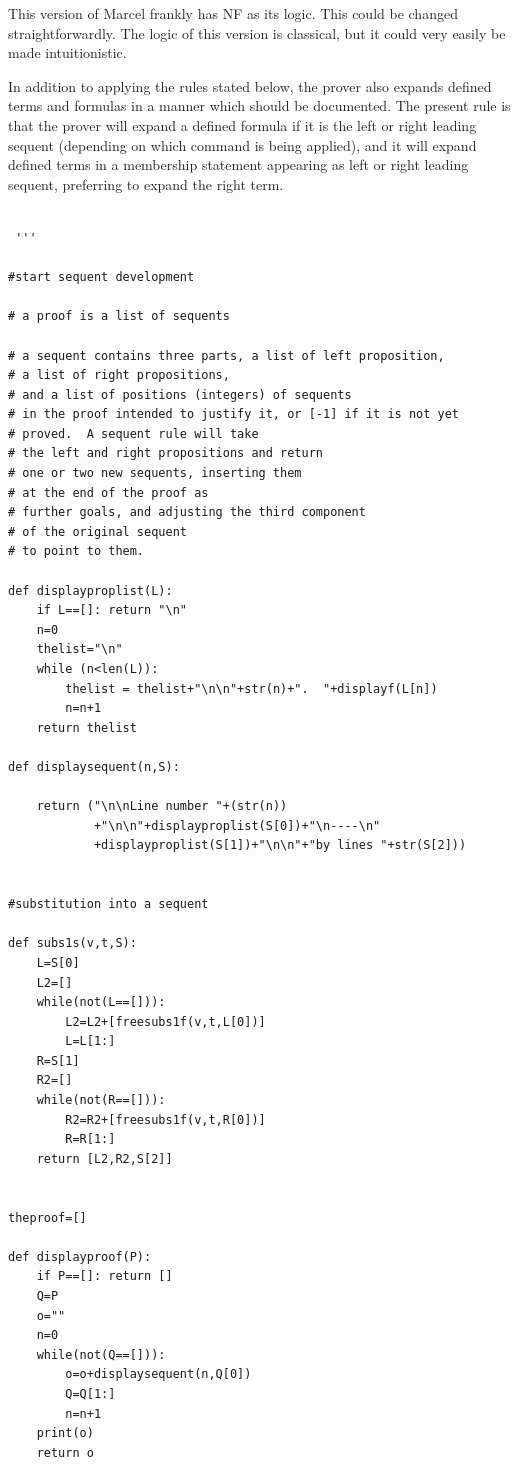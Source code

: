 \documentclass{article}
\begin{document}
This version of Marcel frankly has NF as its logic.  This could be changed straightforwardly.  The logic of this version is classical, but it could very easily be made intuitionistic.

In addition to applying the rules stated below, the prover also expands defined terms and formulas in a manner which should be documented.  The present rule is that the prover will expand a defined formula if it is the left or right leading sequent (depending on which command is being applied), and it will expand defined terms in a membership statement appearing as left or right leading sequent, preferring to expand the right term.
 
 \begin{verbatim}
 
 '''  

#start sequent development

# a proof is a list of sequents

# a sequent contains three parts, a list of left proposition, 
# a list of right propositions,
# and a list of positions (integers) of sequents 
# in the proof intended to justify it, or [-1] if it is not yet
# proved.  A sequent rule will take 
# the left and right propositions and return
# one or two new sequents, inserting them 
# at the end of the proof as
# further goals, and adjusting the third component 
# of the original sequent
# to point to them.

def displayproplist(L):
    if L==[]: return "\n"
    n=0
    thelist="\n"
    while (n<len(L)):
        thelist = thelist+"\n\n"+str(n)+".  "+displayf(L[n])
        n=n+1
    return thelist

def displaysequent(n,S):

    return ("\n\nLine number "+(str(n))
            +"\n\n"+displayproplist(S[0])+"\n----\n"
            +displayproplist(S[1])+"\n\n"+"by lines "+str(S[2]))


#substitution into a sequent

def subs1s(v,t,S):
    L=S[0]
    L2=[]
    while(not(L==[])):
        L2=L2+[freesubs1f(v,t,L[0])]
        L=L[1:]
    R=S[1]
    R2=[]
    while(not(R==[])):
        R2=R2+[freesubs1f(v,t,R[0])]
        R=R[1:]
    return [L2,R2,S[2]]
        

theproof=[]

def displayproof(P):
    if P==[]: return []
    Q=P
    o=""
    n=0
    while(not(Q==[])):
        o=o+displaysequent(n,Q[0])
        Q=Q[1:]
        n=n+1
    print(o)
    return o


\end{verbatim}
\end{document}
